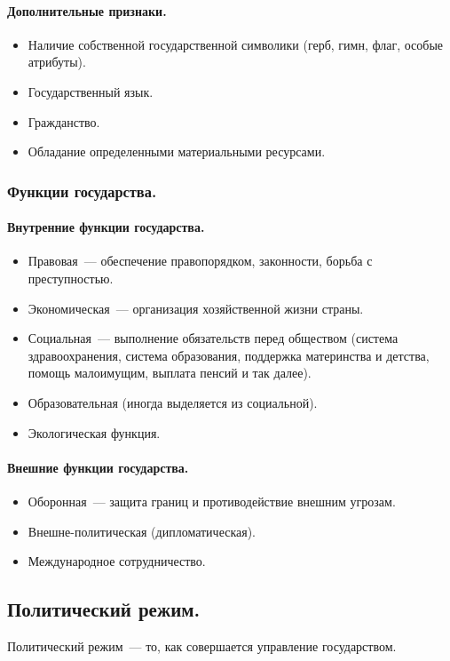 \documentclass[12pt]{article}
\begin{document}
	\paragraph{Дополнительные признаки.}
	\begin{itemize}
		\item Наличие собственной государственной символики (герб, гимн, флаг, особые атрибуты).
		\item Государственный язык.
		\item Гражданство.
		\item Обладание определенными материальными ресурсами.
	\end{itemize}
	\subsubsection{Функции государства.}
	\paragraph{Внутренние функции государства.}
	\begin{itemize}
		\item Правовая~--- обеспечение правопорядком, законности, борьба с преступностью.
		\item Экономическая~--- организация хозяйственной жизни страны.
		\item Социальная~--- выполнение обязательств перед обществом (система здравоохранения, система образования, поддержка материнства и детства, помощь малоимущим, выплата пенсий и так далее).
		\item Образовательная (иногда выделяется из социальной).
		\item Экологическая функция.
	\end{itemize}
	\paragraph{Внешние функции государства.}
	\begin{itemize}
		\item Оборонная~--- защита границ и противодействие внешним угрозам.
		\item Внешне-политическая (дипломатическая).
		\item Международное сотрудничество.
	\end{itemize}
	\subsection{Политический режим.}
	\begin{definition}
		Политический режим~--- то, как совершается управление государством.
	\end{definition}
\end{document}
